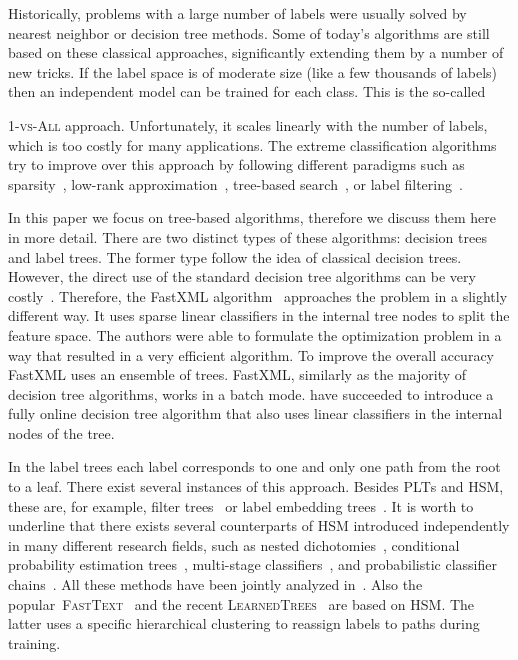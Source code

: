 \documentclass{article}
\newcommand{\Algo}[1]{\textsc{#1}}
\begin{document}
Historically, problems with a large number of labels were usually
solved by nearest neighbor or decision tree methods. Some of today's
algorithms are still based on these classical approaches,
significantly extending them by a number of new tricks. If the label
space is of moderate size (like a few thousands of labels) then an
independent model can be trained for each class. This is the so-called
{\Algo{1-vs-All} approach. Unfortunately, it scales linearly with the
  number of labels, which is too costly for many applications. The
  extreme classification algorithms try to improve over this approach
  by following different paradigms such as
  sparsity~\citep{Yen_et_al_2017,Babbar_Scholkopf_2017}, low-rank
  approximation~\cite{Mineiro_Karampatziakis_2015,Yu_et_al_2014,Bhatia_et_al_2015},
  tree-based
  search~\citep{Prabhu_Varma_2014,Choromanska_Langford_2015}, or label
  filtering~\citep{Vijayanarasimhan_et_al_2014,Shrivastava_Li_2015,Niculescu-Mizil_Abbasnejad_2017}.

In this paper we focus on tree-based algorithms, therefore we discuss them here in more detail. There are two distinct types of these algorithms: decision trees and label trees. The former type follow the idea of classical decision trees. However, the direct use of the standard decision tree algorithms can be very costly~\citep{Agrawal_et_al_2013}. Therefore, the FastXML algorithm~\citep{Prabhu_Varma_2014} approaches the problem in a slightly different way. It uses sparse linear classifiers in the internal tree nodes to split the feature space. The authors were able to formulate the optimization problem in a way that resulted in a very efficient algorithm. To improve the overall accuracy FastXML uses an ensemble of trees. FastXML, similarly as the majority of decision tree algorithms, works in a batch mode. \citet{Choromanska_Langford_2015} have succeeded to introduce a fully online decision tree algorithm that also uses linear classifiers in the internal nodes of the tree.

In the label trees each label corresponds to one and only one path from the root to a leaf. There exist several instances of this approach. Besides \Algo{PLT}s and \Algo{HSM}, these are, for example, filter trees~\citep{Beygelzimer_et_al_2009a,Li_Lin_2014} or label embedding trees~\citep{Bengio_et_al_2010}. It is worth to underline that there exists several counterparts of \Algo{HSM} introduced independently in many different research fields, such as nested dichotomies~\citep{Fox_1997}, conditional probability estimation trees~\citep{Beygelzimer_et_al_2009b}, multi-stage classifiers~\citep{Kurzynski_1988}, and probabilistic classifier chains~\citep{Dembczynski_et_al_2010c}. All these methods have been jointly analyzed in~\citep{Dembczynski_et_al_2016}.
Also the popular~\Algo{FastText}~\citep{Joulin_et_al_2016} and the recent \Algo{LearnedTrees}~\citep{Jernite_et_al_2017} are based on \Algo{HSM}. The latter uses a specific hierarchical clustering to reassign labels to paths during training. 

}
\end{document}
